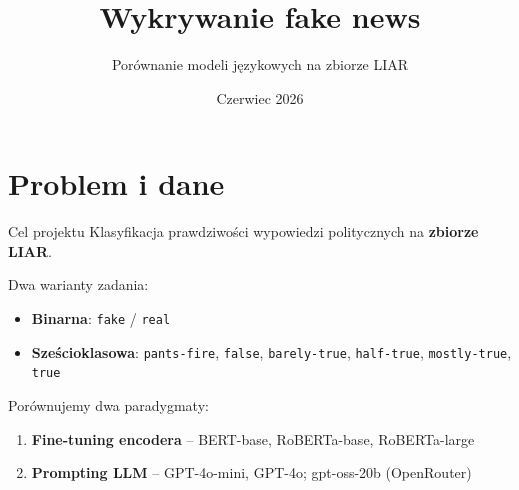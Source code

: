 \documentclass[10pt]{beamer}
\title{Wykrywanie fake news}
\subtitle{Porównanie modeli językowych na zbiorze LIAR}
\date{Czerwiec 2026}
\begin{document}
\maketitle

\section{Problem i dane}

\begin{frame}{Cel projektu}
  Klasyfikacja prawdziwości wypowiedzi politycznych na \textbf{zbiorze LIAR}.

  \vspace{0.5em}
  Dwa warianty zadania:
  \begin{itemize}
    \item \textbf{Binarna}: \texttt{fake} / \texttt{real}
    \item \textbf{Sześcioklasowa}: \texttt{pants-fire}, \texttt{false},
          \texttt{barely-true}, \texttt{half-true}, \texttt{mostly-true}, \texttt{true}
  \end{itemize}

  \vspace{0.5em}
  Porównujemy dwa paradygmaty:
  \begin{enumerate}
    \item \textbf{Fine-tuning encodera} -- BERT-base, RoBERTa-base, RoBERTa-large
    \item \textbf{Prompting LLM} -- GPT-4o-mini, GPT-4o; gpt-oss-20b (OpenRouter)
  \end{enumerate}
\end{frame}
\end{document}
